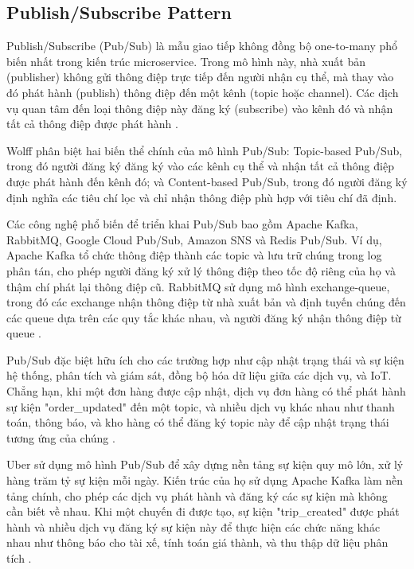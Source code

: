 \subsection{Publish/Subscribe Pattern}
Publish/Subscribe (Pub/Sub) là mẫu giao tiếp không đồng bộ one-to-many phổ biến nhất trong kiến trúc microservice. Trong mô hình này, nhà xuất bản (publisher) không gửi thông điệp trực tiếp đến người nhận cụ thể, mà thay vào đó phát hành (publish) thông điệp đến một kênh (topic hoặc channel). Các dịch vụ quan tâm đến loại thông điệp này đăng ký (subscribe) vào kênh đó và nhận tất cả thông điệp được phát hành \cite{hohpe2004}.

Wolff \cite{wolff2016} phân biệt hai biến thể chính của mô hình Pub/Sub: Topic-based Pub/Sub, trong đó người đăng ký đăng ký vào các kênh cụ thể và nhận tất cả thông điệp được phát hành đến kênh đó; và Content-based Pub/Sub, trong đó người đăng ký định nghĩa các tiêu chí lọc và chỉ nhận thông điệp phù hợp với tiêu chí đã định.

Các công nghệ phổ biến để triển khai Pub/Sub bao gồm Apache Kafka, RabbitMQ, Google Cloud Pub/Sub, Amazon SNS và Redis Pub/Sub. Ví dụ, Apache Kafka tổ chức thông điệp thành các topic và lưu trữ chúng trong log phân tán, cho phép người đăng ký xử lý thông điệp theo tốc độ riêng của họ và thậm chí phát lại thông điệp cũ. RabbitMQ sử dụng mô hình exchange-queue, trong đó các exchange nhận thông điệp từ nhà xuất bản và định tuyến chúng đến các queue dựa trên các quy tắc khác nhau, và người đăng ký nhận thông điệp từ queue \cite{jun2018}.

Pub/Sub đặc biệt hữu ích cho các trường hợp như cập nhật trạng thái và sự kiện hệ thống, phân tích và giám sát, đồng bộ hóa dữ liệu giữa các dịch vụ, và IoT. Chẳng hạn, khi một đơn hàng được cập nhật, dịch vụ đơn hàng có thể phát hành sự kiện "order\_updated" đến một topic, và nhiều dịch vụ khác nhau như thanh toán, thông báo, và kho hàng có thể đăng ký topic này để cập nhật trạng thái tương ứng của chúng \cite{newman2015}.

Uber sử dụng mô hình Pub/Sub để xây dựng nền tảng sự kiện quy mô lớn, xử lý hàng trăm tỷ sự kiện mỗi ngày. Kiến trúc của họ sử dụng Apache Kafka làm nền tảng chính, cho phép các dịch vụ phát hành và đăng ký các sự kiện mà không cần biết về nhau. Khi một chuyến đi được tạo, sự kiện "trip\_created" được phát hành và nhiều dịch vụ đăng ký sự kiện này để thực hiện các chức năng khác nhau như thông báo cho tài xế, tính toán giá thành, và thu thập dữ liệu phân tích \cite{beyer2018}.

